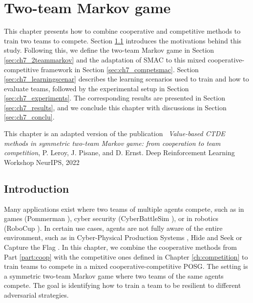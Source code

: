 \chapter{Two-team Markov game}\label{ch:2teams}
\begin{chapter_outline}

This chapter presents how to combine cooperative and competitive methods to train two teams to compete.
Section \ref{sec:ch7_intro} introduces the motivations behind this study.
Following this, we define the two-team Markov game in Section \ref{sec:ch7_2teammarkov} and the adaptation of SMAC to this mixed cooperative-competitive framework in Section \ref{sec:ch7_competsmac}.
Section \ref{sec:ch7_learningscenar} describes the learning scenarios used to train and how to evaluate teams, followed by the experimental setup in Section \ref{sec:ch7_experiments}.
The corresponding results are presented in Section \ref{sec:ch7_results}, and we conclude this chapter with discussions in Section \ref{sec:ch7_conclu}.

This chapter is an adapted version of the publication~\citep{leroy2022twoteam} \textit{Value-based CTDE methods in symmetric two-team Markov game: from cooperation to team competition}, P. Leroy, J. Pisane, and D. Ernst. Deep Reinforcement Learning Workshop NeurIPS, 2022

\end{chapter_outline}

\section{Introduction} \label{sec:ch7_intro}

Many applications exist where two teams of multiple agents compete, such as in games (Pommerman \citep{resnick2018pommerman}), cyber security (CyberBattleSim \citep{kunz2022multiagent}), or in robotics (RoboCup \citep{kitano1997robocup}).
In certain use cases, agents are not fully aware of the entire environment, such as in Cyber-Physical Production Systems \citep{phan2020learning}, Hide and Seek \citep{baker2019emergent} or Capture the Flag \citep{jaderberg2019human}.
In this chapter, we combine the cooperative methods from Part \ref{part:coop} with the competitive ones defined in Chapter \ref{ch:competition} to train teams to compete in a mixed cooperative-competitive POSG.
The setting is a symmetric two-team Markov game where two teams of the same agents compete.
The goal is identifying how to train a team to be resilient to different adversarial strategies.

